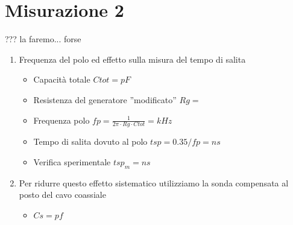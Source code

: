 \documentclass{report}
\begin{document}
\section{Misurazione 2}
??? la faremo... forse

\begin{enumerate}
\item Frequenza del polo ed effetto sulla misura del tempo di salita
  \begin{itemize}
    \item Capacità totale \(Ctot = pF\)
    \item Resistenza del generatore ”modificato” \(Rg= \)
    \item Frequenza polo \(fp = \tfrac{1}{2\pi \cdot Rg \cdot Ctot} = kHz \)
    \item Tempo di salita dovuto al polo \(tsp= 0.35/fp = ns\)
    \item Verifica sperimentale \(tsp_m = ns\)
    \end{itemize}

\item Per ridurre questo effetto sistematico utilizziamo la sonda compensata al posto del cavo coassiale
 \begin{itemize}
 \item  \(Cs= pf\)
 \end{itemize}
\end{enumerate}
\end{document}

